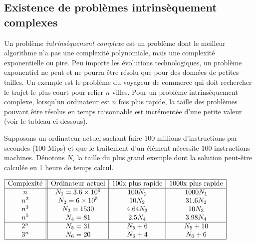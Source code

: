 \subsection{Existence de problèmes intrinsèquement complexes}
\label{subsec:existence_de_problemes_intrinsequement_complexes}

\begin{mydef}
	Un problème \emph{intrinsèquement complexe} est un problème dont le meilleur algorithme n'a pas une complexité polynomiale, mais une complexité exponentielle ou pire. Peu importe les évolutions technologiques, un problème exponentiel ne peut et ne pourra être résolu que pour des données de petites tailles.  Un exemple est le problème du voyageur de commerce qui doit rechercher le trajet le plus court pour relier $n$ villes. Pour un problème intrinsèquement complexe, lorsqu'un ordinateur est $n$ fois plus rapide, la taille des problèmes pouvant être résolus en temps raisonnable est incrémentée d'une petite valeur (voir le tableau ci-dessous).
\end{mydef}

Supposons un ordinateur actuel sachant faire 100 millions d'instructions par secondes ($100$ Mips) et que le traitement d'un élément nécessite 100 instructions machines. Dénotons $N_i$  la taille du \og plus grand\fg{} exemple dont la solution peut-être calculée en 1 heure de temps calcul.

\begin{center}
	$\begin{array}{|c||c|c|c|}
			\hline
			\text{Complexité} & \text{Ordinateur actuel} & \text{100x plus rapide} & \text{1000x plus rapide} \\
			\hline
			n                 & N_1 = 3.6\times 10^9     & 100 N_1                 & 1000 N_1                 \\
			n^2               & N_2 = 6\times 10^5       & 10 N_2                  & 31.6 N_2                 \\
			n^3               & N_3 = 1530               & 4.64 N_3                & 10 N_3                   \\
			n^5               & N_4 = 81                 & 2.5 N_4                 & 3.98 N_4                 \\
			\hline
			2^n               & N_5 = 31                 & N_5 + 6                 & N_5 + 10                 \\
			3^n               & N_6 = 20                 & N_6 + 4                 & N_6 + 6                  \\
			\hline
		\end{array}$
\end{center}

